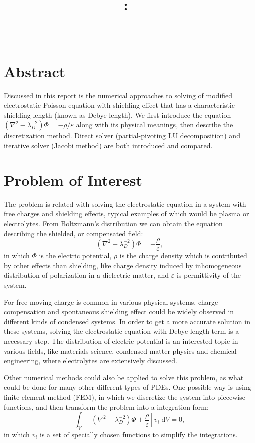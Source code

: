 \documentclass{article}
\title{\vspace{2in}\textmd{\textbf{\hmwkClass:\ \hmwkTitle}} \\
\vspace{0.1in}\large{ \hmwkClassTime}\vspace{3in}}
\author{\textbf{\hmwkAuthorName} \\ \vspace{0.1in}
\hmwkDueDate }
\date{} %
\begin{document}
\begin{spacing}{1.1}
\maketitle

\newpage
\section*{Abstract}

Discussed in this report is the numerical approaches to solving of modified electrostatic Poisson equation with shielding effect that has a characteristic shielding length (known as Debye length). We first introduce the equation $(\nabla^2 - \lambda_D^{-2})\Phi =-\rho / \varepsilon$ along with its physical meanings, then describe the discretization method. Direct solver (partial-pivoting LU decomposition) and iterative solver (Jacobi method) are both introduced and compared.

\section{Problem of Interest}

The problem is related with solving the electrostatic equation in a system with free charges and shielding effects, typical examples of which would be plasma or electrolytes. From Boltzmann's distribution we can obtain the equation describing the shielded, or compensated field:
\[(\nabla^2 - \lambda_D^{-2})\Phi=-\frac{\rho}{\varepsilon},\]
in which $\Phi$ is the electric potential, $\rho$ is the charge density which is contributed by other effects than shielding, like charge density induced by inhomogeneous distribution of polarization in a dielectric matter, and $\varepsilon$ is permittivity of the system.

For free-moving charge is common in various physical systems, charge compensation and spontaneous shielding effect could be widely observed in different kinds of condensed systems. In order to get a more accurate solution in these systems, solving the electrostatic equation with Debye length term is a necessary step. The distribution of electric potential is an interested topic in various fields, like materials science, condensed matter physics and chemical engineering, where electrolytes are extensively discussed.

Other numerical methods could also be applied to solve this problem, as what could be done for many other different types of PDEs. One possible way is using finite-element method (FEM), in which we discretize the system into piecewise functions, and then transform the problem into a integration form:
\[\int_V\left[(\nabla^2-\lambda_D^{-2})\Phi+\frac{\rho}{\varepsilon}\right]v_i\;\mathrm{d}V=0,\]
in which $v_i$ is a set of specially chosen functions to simplify the integrations.


\end{spacing}
\end{document}
